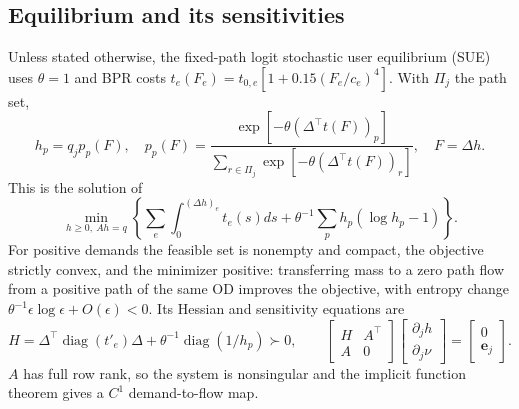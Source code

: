 \subsection{Equilibrium and its sensitivities}\label{supp:sue}
Unless stated otherwise, the fixed-path logit stochastic user equilibrium
(SUE) uses $\theta=1$ and BPR costs
$t_e(F_e)=t_{0,e}[1+0.15(F_e/c_e)^4]$. With $\Pi_j$ the path set,
\begin{equation}
h_p=q_jp_p(F),\quad
p_p(F)=\frac{\exp[-\theta(\Delta^\top t(F))_p]}
{\sum_{r\in\Pi_j}\exp[-\theta(\Delta^\top t(F))_r]},\quad
F=\Delta h.\label{eq:sueloading}
\end{equation}
This is the solution of
\[
\min_{h\ge0,\ Ah=q}\left\{
\sum_e\int_0^{(\Delta h)_e}t_e(s)ds+
\theta^{-1}\sum_p h_p(\log h_p-1)\right\}.
\]
For positive demands the feasible set is nonempty and compact, the
objective strictly convex, and the minimizer positive: transferring
mass to a zero path flow from a positive path of the same OD improves
the objective, with entropy change
$\theta^{-1}\epsilon\log\epsilon+O(\epsilon)<0$. Its Hessian and
sensitivity equations are
\begin{equation}
H=\Delta^\top\operatorname{diag}(t'_e)\Delta+
\theta^{-1}\operatorname{diag}(1/h_p)\succ0,\qquad
\begin{bmatrix}H&A^\top\\A&0\end{bmatrix}
\begin{bmatrix}\partial_jh\\\partial_j\nu\end{bmatrix}
=\begin{bmatrix}0\\\mathbf e_j\end{bmatrix}.
\label{eq:kkt_sensitivity}
\end{equation}
$A$ has full row rank, so the system is nonsingular and the implicit
function theorem gives a $C^1$ demand-to-flow map.

